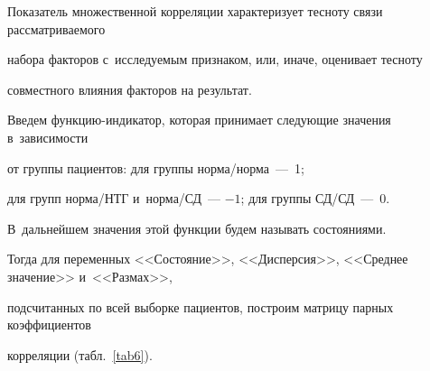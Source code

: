 Показатель множественной корреляции характеризует тесноту связи рас\-смат\-ри\-ва\-емо\-го 

набора факторов с~исследуемым признаком, или, иначе, оценивает тесноту 

совместного влияния факторов на результат.



Введем функцию-индикатор, которая принимает следующие значения в~зависимости 

от группы пациентов: для группы нор\-ма/нор\-ма~---~1; 

для групп нор\-ма/НТГ и~нор\-ма/СД~--- $-1$; для группы СД/СД~---~0. 

В~дальнейшем значения этой функции будем называть состояниями.



Тогда для переменных <<Состояние>>, <<Дисперсия>>, <<Среднее значение>> и~<<Размах>>, 

подсчитанных по всей выборке пациентов, построим матрицу парных коэффициентов 

корреляции (табл.~\ref{tab6}).



